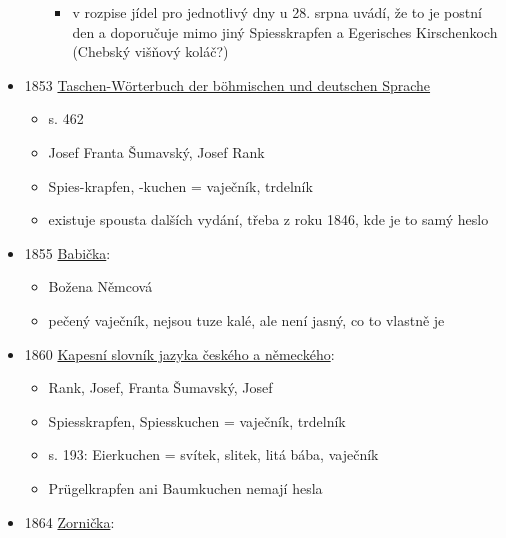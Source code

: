 \begin{itemize}
\begin{itemize}
    \begin{itemize}
    \tightlist
    \item
      v rozpise jídel pro jednotlivý dny u 28. srpna uvádí, že to je
      postní den a doporučuje mimo jiný Spiesskrapfen a Egerisches
      Kirschenkoch (Chebský višňový koláč?)
    \end{itemize}
  \end{itemize}
\item
  1853
  \href{https://www.google.cz/books/edition/Taschen_W\%C3\%B6rterbuch_der_b\%C3\%B6hmischen_und/tDlFAAAAYAAJ?hl=cs&gbpv=1&dq=trdeln\%C3\%ADk&pg=PA462&printsec=frontcover}{Taschen-Wörterbuch
  der böhmischen und deutschen Sprache}

  \begin{itemize}
  \tightlist
  \item
    s. 462
  \item
    Josef Franta Šumavský, Josef Rank
  \item
    Spies-krapfen, -kuchen = vaječník, trdelník
  \item
    existuje spousta dalších vydání, třeba z roku 1846, kde je to samý
    heslo
  \end{itemize}
\item
  1855
  \href{https://ceskadigitalniknihovna.cz/uuid/uuid:2f58bcf0-f6ae-11dd-8224-000d606f5dc6}{Babička}:

  \begin{itemize}
  \tightlist
  \item
    Božena Němcová
  \item
    pečený vaječník, nejsou tuze kalé, ale není jasný, co to vlastně je
  \end{itemize}
\item
  1860
  \href{https://ceskadigitalniknihovna.cz/uuid/uuid:f5239995-7f7b-4b26-8ceb-d90eebcd974c}{Kapesní
  slovník jazyka českého a německého}:

  \begin{itemize}
  \tightlist
  \item
    Rank, Josef, Franta Šumavský, Josef
  \item
    Spiesskrapfen, Spiesskuchen = vaječník, trdelník
  \item
    s. 193: Eierkuchen = svítek, slitek, litá bába, vaječník
  \item
    Prügelkrapfen ani Baumkuchen nemají hesla
  \end{itemize}
\item
  1864
  \href{https://dikda.snk.sk/uuid/uuid:43f40487-25fd-438a-b8b6-e0c25985b2c7}{Zornička}:


\end{itemize}

